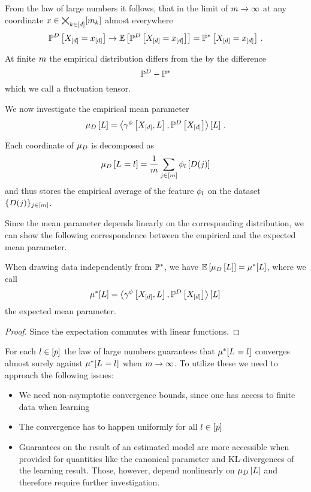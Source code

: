From the law of large numbers it follows, that in the limit of $m\rightarrow\infty$ at any coordinate $x\in\bigtimes_{k\in[d]}[m_{k}]$ almost everywhere
\[ \mathbb{P}^{D}\left[X_{[d]}=x_{[d]}\right] \rightarrow \mathbb{E}\left[\mathbb{P}^{D}\left[X_{[d]}=x_{[d]}\right]\right] =  \mathbb{P}^*\left[X_{[d]}=x_{[d]}\right] \, . \]

At finite $m$ the empirical distribution differs from the by the difference
\[ \mathbb{P}^{D} - \mathbb{P}^* \]
which we call a fluctuation tensor.


We now investigate the empirical mean parameter
\[
    \mu_{D}\left[L\right] = \left\langle \gamma^{\phi}\left[X_{[d]},L\right],\mathbb{P}^{D}\left[X_{[d]}\right]\right\rangle \left[ L \right] \, .
\]

Each coordinate of $\mu_{D}$ is decomposed as
\[ \mu_{D}\left[L_{}=l_{}\right] = \frac{1}{m}\sum_{j\in[m]} \phi_{l}\left[D(j)\right] \]
and thus stores the empirical average of the feature $\phi_{l}$ on the dataset $\{D(j)\}_{j\in[m]}$.

Since the mean parameter depends linearly on the corresponding distribution, we can show the following correspondence between the empirical and the expected mean parameter.

\begin{theorem}
    \label{the:expectedMeanParameter}
    When drawing data independently from $\mathbb{P}^*$, we have $\mathbb{E}\left[\mu_{D}\left[L\right]\right]=\mu^*[L]$, where we call
    \[
        \mu^*[L] = \left\langle \gamma^{\phi}\left[X_{[d]},L\right],\mathbb{P}^{D}\left[X_{[d]}\right]\right\rangle \left[ L \right] \,
    \]
    the expected mean parameter.
\end{theorem}
\begin{proof}
    Since the expectation commutes with linear functions.
\end{proof}


For each $l\in[p]$ the law of large numbers guarantees that $\mu^*[L_{}=l_{}]$ converges almost surely against $\mu^*[L_{}=l_{}]$ when $m\rightarrow\infty$.
To utilize these we need to approach the following issues:
\begin{itemize}
    \item We need non-asymptotic convergence bounds, since one has access to finite data when learning
    \item The convergence has to happen uniformly for all $l\in[p]$
    \item Guarantees on the result of an estimated model are more accessible when provided for quantities like the canonical parameter and KL-divergences of the learning result.
    Those, however, depend nonlinearly on $\mu_{D}\left[L\right]$ and therefore require further investigation.
\end{itemize}


